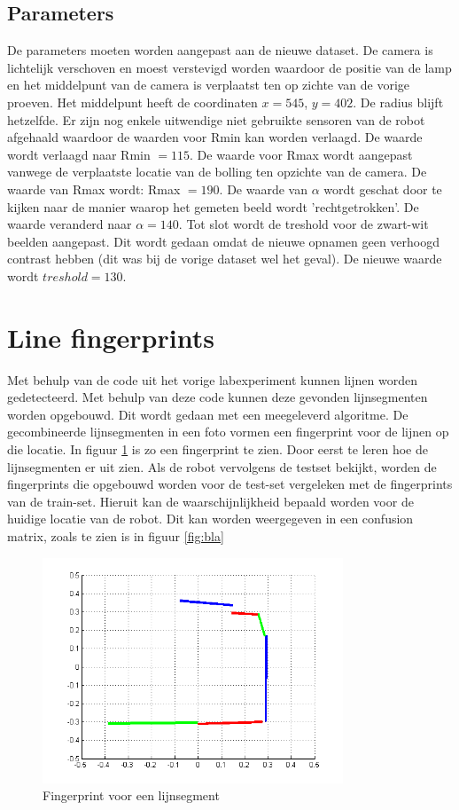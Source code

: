 \documentclass[a4paper]{article}
\begin{document}
\subsection{Parameters}
De parameters moeten worden aangepast aan de nieuwe dataset. De camera is lichtelijk verschoven en moest verstevigd worden waardoor de positie van de lamp en het middelpunt van de camera is verplaatst ten op zichte van de vorige proeven. Het middelpunt heeft de coordinaten $x = 545$, $y = 402$. De radius blijft hetzelfde. Er zijn nog enkele uitwendige niet gebruikte sensoren van de robot afgehaald waardoor de waarden voor Rmin kan worden verlaagd. De waarde wordt verlaagd naar Rmin $= 115$. De waarde voor Rmax wordt aangepast vanwege de verplaatste locatie van de bolling ten opzichte van de camera. De waarde van Rmax wordt: Rmax $= 190$. De waarde van $\alpha$ wordt geschat door te kijken naar de manier waarop het gemeten beeld wordt 'rechtgetrokken'. De waarde veranderd naar $\alpha = 140$. Tot slot wordt de treshold voor de zwart-wit beelden aangepast. Dit wordt gedaan omdat de nieuwe opnamen geen verhoogd contrast hebben (dit was bij de vorige dataset wel het geval). De nieuwe waarde wordt  $treshold = 130$.


\section{Line fingerprints}
Met behulp van de code uit het vorige labexperiment kunnen lijnen worden gedetecteerd. Met behulp van deze code kunnen deze gevonden lijnsegmenten worden opgebouwd. Dit wordt gedaan met een meegeleverd algoritme. De gecombineerde lijnsegmenten in een foto vormen een fingerprint voor de lijnen op die locatie. In figuur \ref{fig:lijnfinger} is zo een fingerprint te zien. Door eerst te leren hoe de lijnsegmenten er uit zien. Als de robot vervolgens de testset bekijkt, worden de fingerprints die opgebouwd worden voor de test-set vergeleken met de fingerprints van de train-set. Hieruit kan de waarschijnlijkheid bepaald worden voor de huidige locatie van de robot. Dit kan worden weergegeven in een confusion matrix, zoals te zien is in figuur \ref{fig:bla}
\begin{figure}[h]
	\centering
	\includegraphics[width=0.8\textwidth]{fingerprint.png}
	\caption{Fingerprint voor een lijnsegment}
	\label{fig:lijnfinger}
\end{figure}
\end{document}
